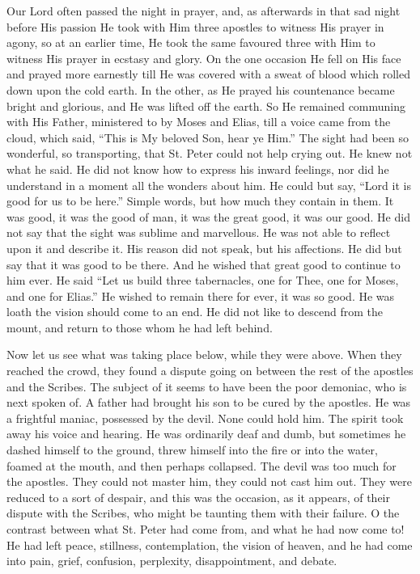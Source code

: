 Our Lord often passed the night in prayer, and,
as afterwards in that sad night before His passion He took with Him
three apostles to witness His prayer in agony, so at an earlier time,
He took the same favoured three with Him to witness His prayer in
ecstasy and glory. On the one occasion He fell on His face and prayed
more earnestly till He was covered with a sweat of blood which rolled
down upon the cold earth. In the other, as He prayed his countenance
became bright and glorious, and He was lifted off the earth. So He
remained communing with His Father, ministered to by Moses and Elias,
till a voice came from the cloud, which said, ``This is My beloved
Son, hear ye Him.'' The sight had been so wonderful, so
transporting, that St. Peter could not help crying out. He knew not
what he said. He did not know how to express his inward feelings, nor
did he understand in a moment all the wonders about him. He could but
say, ``Lord it is good for us to be here.'' Simple words, but how
much they contain in them. It was good, it was the good of man, it was
the great good, it was our good. He did not say that the sight was
sublime and marvellous. He was not able to reflect upon it and
describe it. His reason did not speak, but his affections. He did but
say that it was good to be there. And he wished that great good to
continue to him ever. He said ``Let us build three tabernacles,
one for Thee, one for Moses, and one for Elias.'' He wished to remain
there for ever, it was so good. He was loath the vision should come to
an end. He did not like to descend from the mount, and return to those
whom he had left behind.

Now let us see what was taking place below, while
they were above. When they reached the crowd, they found a dispute
going on between the rest of the apostles and the Scribes. The subject
of it seems to have been the poor demoniac, who is next spoken of. A
father had brought his son to be cured by the apostles. He was a
frightful maniac, possessed by the devil. None could hold him. The
spirit took away his voice and hearing. He was ordinarily deaf and
dumb, but sometimes he dashed himself to the ground, threw
himself into the fire or into the water, foamed at the mouth, and then
perhaps collapsed. The devil was too much for the apostles. They could
not master him, they could not cast him out. They were reduced to a
sort of despair, and this was the occasion, as it appears, of their
dispute with the Scribes, who might be taunting them with their
failure. O the contrast between what St. Peter had come from, and what
he had now come to! He had left peace, stillness, contemplation, the
vision of heaven, and he had come into pain, grief, confusion,
perplexity, disappointment, and debate.

